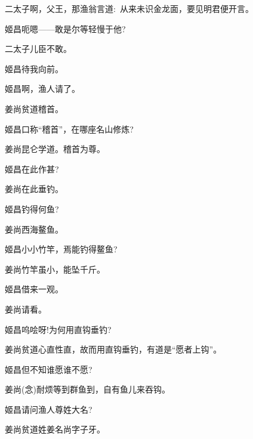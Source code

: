 {{\akai 二}太子\hspace{20pt}啊，父王，那渔翁言道:~从来未识金龙面，要见明君便开言。

姬昌\hspace{30pt}呃嗯------敢是尔等轻慢于他?

{\akai 二}太子\hspace{20pt}儿臣不敢。

姬昌\hspace{30pt}待我向前。

姬昌\hspace{30pt}啊，渔人请了。

姜尚\hspace{30pt}贫道稽首。

姬昌\hspace{30pt}口称``稽首''，在哪座名山修炼?

姜尚\hspace{30pt}昆仑学道。稽首为尊。

姬昌\hspace{30pt}在此作甚?

姜尚\hspace{30pt}在此垂钓。

姬昌\hspace{30pt}钓得何鱼?

姜尚\hspace{30pt}西海鳌鱼。

姬昌\hspace{30pt}小小竹竿，焉能钓得鳌鱼?

姜尚\hspace{30pt}竹竿虽小，能坠千斤。

姬昌\hspace{30pt}借来一观。

姜尚\hspace{30pt}请看。

姬昌\hspace{30pt}呜哙呀!为何用直钩垂钓?

姜尚\hspace{30pt}贫道心直性直，故而用直钩垂钓，有道是``愿者上钩''。

姬昌\hspace{30pt}但不知谁愿谁不愿?

姜尚\hspace{30pt}({\akai 念})耐烦等到群鱼到，自有鱼儿来吞钩。

姬昌\hspace{30pt}请问渔人尊姓大名?

姜尚\hspace{30pt}贫道姓姜名尚字子牙。

}
